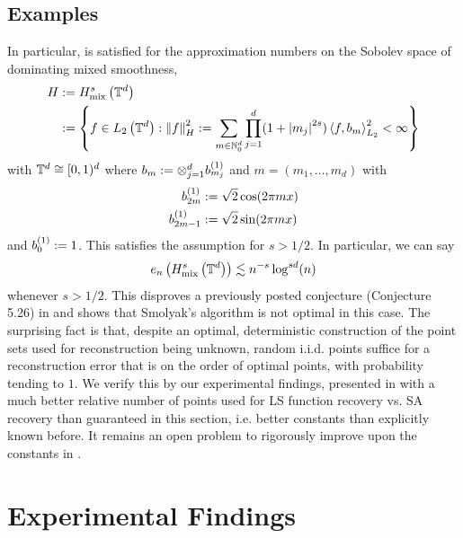 \documentclass[12pt, oneside]{amsart}
\theoremstyle{definition}
\theoremstyle{remark}
\numberwithin{equation}{section}
\begin{document}
\subsection*{Examples}
In particular,  is satisfied for the 
approximation numbers on the Sobolev space of dominating mixed smoothness, 
\begin{align*}
	H &\defn H_{\text{mix}}^s\left(\T^d\right)\\
	&\defn \set{f \in L_2\left(\T^d\right) : \norm[H]{f}^2 \defn \sum_{m \in 
			\N_0^d} \prod_{j=1}^d (1+\abs{m_j}^{2s}) \inner{f}{b_m}^2_{L_2} < 
			\infty}
\end{align*}
with \(\T^d \cong [0, 1)^d\) 
where \(b_m \defn \otimes_{j=1}^d b_{m_j}^{(1)}\) and \(m = (m_1, \dots, m_d)\) 
with \begin{align*}
	b_{2m}^{(1)} &\defn \sqrt{2}\cos(2\pi m x)\\
	b_{2m-1}^{(1)} &\defn \sqrt{2}\sin(2\pi m x)
\end{align*}
and \(b_0^{(1)} \defn 1\). This satisfies the assumption for \(s > 1/2\). In 
particular, we can say
\begin{equation}\label{eq:conclusio}
	e_n\left( H_{\text{mix}}^s\left(\T^d\right) \right) \lesssim 
	n^{-s}\log^{sd}(n)
\end{equation}
whenever \(s > 1/2\). This disproves a previously posted conjecture (Conjecture 
5.26) in \cite{Dung_Temlyakov_Ullrich_2018} and shows that Smolyak's algorithm 
is not optimal in this case. The surprising fact is that, despite an optimal, 
deterministic construction of the point sets used for reconstruction being 
unknown, random i.i.d. points suffice for a reconstruction error that is on the 
order of optimal points, with probability tending to \(1\). We verify this by 
our experimental findings, presented in  with a 
much better relative number of points used for LS function recovery vs. SA 
recovery than guaranteed in this section, i.e. better constants than explicitly 
known before. It remains an open problem to rigorously improve upon the 
constants in .

\section{Experimental Findings}\label{sec:experimentalFindings}
\end{document}
